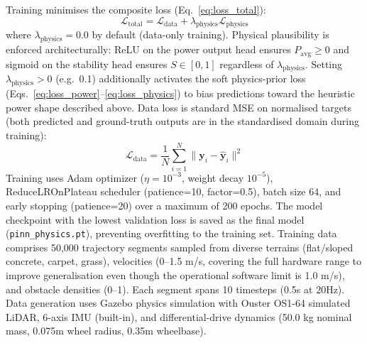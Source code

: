 \documentclass[pdflatex,sn-nature]{sn-jnl}%
\begin{document}
Training minimises the composite loss (Eq.~\ref{eq:loss_total}):
\begin{equation}
\mathcal{L}_{\text{total}} = \mathcal{L}_{\text{data}} + \lambda_{\text{physics}} \mathcal{L}_{\text{physics}}
\label{eq:loss_total}
\end{equation}
where $\lambda_{\text{physics}} = 0.0$ by default (data-only training). Physical plausibility is enforced architecturally: ReLU on the power output head ensures $P_{\text{avg}} \geq 0$ and sigmoid on the stability head ensures $S \in [0,1]$ regardless of $\lambda_{\text{physics}}$. Setting $\lambda_{\text{physics}} > 0$ (e.g.\ 0.1) additionally activates the soft physics-prior loss (Eqs.~\ref{eq:loss_power}--\ref{eq:loss_physics}) to bias predictions toward the heuristic power shape described above. Data loss is standard MSE on normalised targets (both predicted and ground-truth outputs are in the standardised domain during training):
\begin{equation}
\mathcal{L}_{\text{data}} = \frac{1}{N} \sum_{i=1}^N \| \mathbf{y}_i - \hat{\mathbf{y}}_i \|^2
\label{eq:loss_data}
\end{equation}
Training uses Adam optimizer ($\eta = 10^{-3}$, weight decay $10^{-5}$), ReduceLROnPlateau scheduler (patience=10, factor=0.5), batch size 64, and early stopping (patience=20) over a maximum of 200 epochs. The model checkpoint with the lowest validation loss is saved as the final model (\texttt{pinn\_physics.pt}), preventing overfitting to the training set. Training data comprises 50,000 trajectory segments sampled from diverse terrains (flat/sloped concrete, carpet, grass), velocities (0--1.5 m/s, covering the full hardware range to improve generalisation even though the operational software limit is 1.0 m/s), and obstacle densities (0--1). Each segment spans 10 timesteps (0.5s at 20Hz). Data generation uses Gazebo physics simulation with Ouster OS1-64 simulated LiDAR, 6-axis IMU (built-in), and differential-drive dynamics (50.0 kg nominal mass, 0.075m wheel radius, 0.35m wheelbase).
\end{document}

